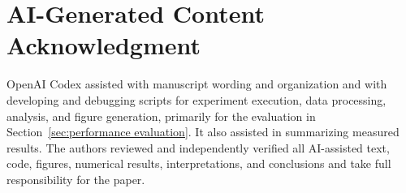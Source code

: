 \documentclass[conference]{IEEEtran}
\begin{document}
\section*{AI-Generated Content Acknowledgment}
OpenAI Codex assisted with manuscript wording and organization and with developing and debugging scripts for experiment execution, data processing, analysis, and figure generation, primarily for the evaluation in Section~\ref{sec:performance evaluation}. It also assisted in summarizing measured results. The authors reviewed and independently verified all AI-assisted text, code, figures, numerical results, interpretations, and conclusions and take full responsibility for the paper.



\end{document}
